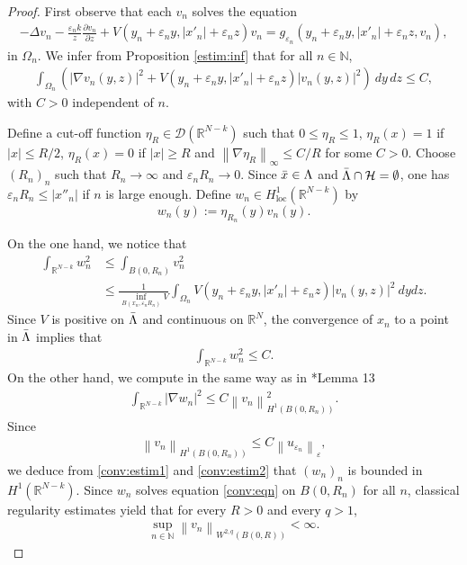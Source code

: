 \documentclass[a4paper]{amsart}
\begin{document}
\begin{proof}
 First observe that each $v_n$ solves the equation
\begin{align}\label{conv:eqn}
 -\Delta v_n - \frac{\varepsilon_n k}{z} {\frac{\partial {v_n}}{\partial {z}}} + V(y_{n} + \varepsilon_n y, {\left| {x'_{n}} \right|} + \varepsilon_n z) v_n = 
g_{\varepsilon_n} (y_{n} + \varepsilon_n y, {\left| {x'_{n}} \right|} + \varepsilon_n z, v_n), 
\end{align}
in $\Omega_n$. We infer from Proposition \ref{estim:inf} that for all $n \in {\mathbb{N}}$,
\begin{align*}
 \int_{\Omega_n} \left( {\left| {\nabla v_n(y,z)} \right|}^2 + V(y_{n} + \varepsilon_n y, {\left| {x'_{n}} \right|} + \varepsilon_n z)
{\left| {v_n(y,z)} \right|}^2 \right)\: dy\, dz \leq C,
\end{align*}
with $C>0$ independent of $n$.

Define a cut-off function $\eta_R \in \mathcal{D}({\mathbb{R}}^{N-k})$ such that $0\leq \eta_R \leq 1$, $\eta_R(x) = 1$ if
${\left| {x} \right|} \leq R/2$, $\eta_R(x)=0$ if ${\left| {x} \right|}\geq R$ and ${\left\| {\nabla\eta_R} \right\|}_{\infty} \leq C/R$ for some $C>0$. Choose
$(R_n)_n$ such that $R_n\to\infty$ and $\varepsilon_n R_n \to 0$. Since $\Bar{x} \in \Lambda$ and $\Bar{\Lambda} \cap 
\mathcal{H}=\emptyset$, one has $\varepsilon_n R_n \leq {\left| {x''_{n}} \right|}$ if $n$ is large enough. 
Define $w_n \in H^1_{\mathrm{loc}}({\mathbb{R}}^{N-k})$ by
\[
 w_n(y) := \eta_{R_n}(y) v_n(y).
\]

On the one hand, we notice that
\[
 \begin{split}
 \int_{{\mathbb{R}}^{N-k}} w_n^2 &\leq \int_{B(0,R_n)} v_n^2  \\
&\leq \frac{1}{\inf_{B(x_n,\varepsilon_n R_n)} V} \int_{\Omega_n} V(y_{n}
+ \varepsilon_n y, {\left| {x'_{n}} \right|} + \varepsilon_n z) {\left| {v_n(y,z)} \right|}^2\: dy dz.
 \end{split}
\]
Since $V$ is positive on $\Bar{\Lambda}$ and continuous on ${\mathbb{R}}^N$, the convergence of $x_n$ to a point in $\Bar{\Lambda}$ implies that 
\begin{align}\label{conv:estim1}
 \int_{{\mathbb{R}}^{N-k}} w_n^2 \leq C.
\end{align}
On the other hand, we compute in the same way as in \cite{BVS}*{Lemma 13}
\begin{align}\label{conv:estim2}
 \int_{{\mathbb{R}}^{N-k}} {\left| {\nabla w_n} \right|}^2 \leq C {\left\| {v_n} \right\|}^2_{H^1(B(0,R_n))}.
\end{align}
Since
\begin{align*}
 {\left\| {v_n} \right\|}_{H^1(B(0,R_n))} \leq C {\left\| {u_{\varepsilon_n}} \right\|}_{\varepsilon},
\end{align*}
we deduce from \eqref{conv:estim1} and \eqref{conv:estim2} that $(w_n)_n$ is bounded in $H^1({\mathbb{R}}^{N-k})$. Since $w_n$
solves equation \eqref{conv:eqn} on $B(0,R_n)$ for all $n$, classical regularity estimates yield that for every $R>0$
and every $q>1$,
\begin{align}\label{conv:estimW2q}
 \sup_{n\in {\mathbb{N}}} {\left\| {v_n} \right\|}_{W^{2,q}(B(0,R))} < \infty.
\end{align}


\end{proof}
\end{document}
